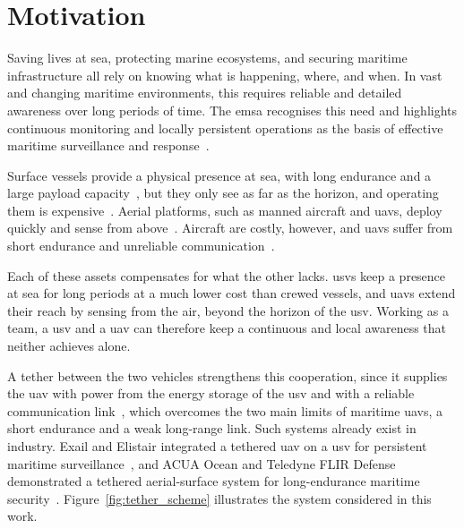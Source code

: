 
\section{Motivation}
\label{sec:intro_motivation}

Saving lives at sea, protecting marine ecosystems, and securing maritime infrastructure all rely on knowing what is happening, where, and when. In vast and changing maritime environments, this requires reliable and detailed awareness over long periods of time. The \gls{emsa} recognises this need and highlights continuous monitoring and locally persistent operations as the basis of effective maritime surveillance and response~\cite{europeanmaritimesafetyagencyEMSAOutlook2025_v302025}.

Surface vessels provide a physical presence at sea, with long endurance and a large payload capacity~\cite{liu2016usv}, but they only see as far as the horizon, and operating them is expensive~\cite{introduction_motivation_vessel_tasks}. Aerial platforms, such as manned aircraft and \glspl{uav}, deploy quickly and sense from above~\cite{introduction_motivation_aerial_surveillance}. Aircraft are costly, however, and \glspl{uav} suffer from short endurance and unreliable communication~\cite{zeng2016uav,kishk2020tethered}.

Each of these assets compensates for what the other lacks. \glspl{usv} keep a presence at sea for long periods at a much lower cost than crewed vessels, and \glspl{uav} extend their reach by sensing from the air, beyond the horizon of the \gls{usv}. Working as a team, a \gls{usv} and a \gls{uav} can therefore keep a continuous and local awareness that neither achieves alone.

A tether between the two vehicles strengthens this cooperation, since it supplies the \gls{uav} with power from the energy storage of the \gls{usv} and with a reliable communication link~\cite{kishk2020tethered}, which overcomes the two main limits of maritime \glspl{uav}, a short endurance and a weak long-range link. Such systems already exist in industry. Exail and Elistair integrated a tethered \gls{uav} on a \gls{usv} for persistent maritime surveillance~\cite{exail_elistair_tethered}, and ACUA Ocean and Teledyne FLIR Defense demonstrated a tethered aerial-surface system for long-endurance maritime security~\cite{acua_ocean_teledyne_mod}. Figure~\ref{fig:tether_scheme} illustrates the system considered in this work.

